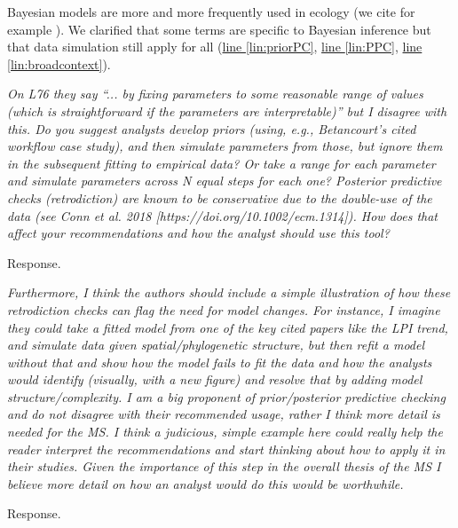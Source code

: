 \documentclass[11pt,letter]{article}
\begin{document}
Bayesian models are more and more frequently used in ecology (we cite for example \citealp{Johnson2024}). %
We clarified that some terms are specific to Bayesian inference but that data simulation still apply for all (\href{file:forecastflows_r1\#lintarget:priorPC}{line \ref*{lin:priorPC}}, \href{file:forecastflows_r1\#lintarget:PPC}{line \ref*{lin:PPC}}, \href{file:forecastflows_r1\#lintarget:broadcontext}{line \ref*{lin:broadcontext}}).

\begin{mybox}
\emph{On L76 they say “... by fixing parameters to some reasonable range of values (which is straightforward if the parameters are interpretable)” but I disagree with this. Do you suggest analysts develop priors (using, e.g., Betancourt’s cited workflow case study), and then simulate parameters from those, but ignore them in the subsequent fitting to empirical data? Or take a range for each parameter and simulate parameters across N equal steps for each one? Posterior predictive checks (retrodiction) are known to be conservative due to the double-use of the data (see Conn et al. 2018 [https://doi.org/10.1002/ecm.1314]). How does that affect your recommendations and how the analyst should use this tool?}
\end{mybox}

Response.

\begin{mybox}
\emph{Furthermore, I think the authors should include a simple illustration of how these retrodiction checks can flag the need for model changes. For instance, I imagine they could take a fitted model from one of the key cited papers like the LPI trend, and simulate data given spatial/phylogenetic structure, but then refit a model without that and show how the model fails to fit the data and how the analysts would identify (visually, with a new figure) and resolve that by adding model structure/complexity. I am a big proponent of prior/posterior predictive checking and do not disagree with their recommended usage, rather I think more detail is needed for the MS. I think a judicious, simple example here could really help the reader interpret the recommendations and start thinking about how to apply it in their studies. Given the importance of this step in the overall thesis of the MS I believe more detail on how an analyst would do this would be worthwhile.}
\end{mybox}

Response.
\end{document}

